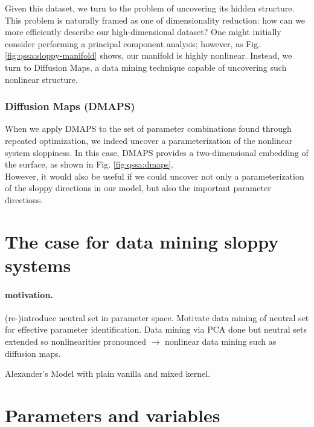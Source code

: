 \documentclass{article}
\begin{document}
Given this dataset, we turn to the problem of uncovering its hidden structure. This
problem is naturally framed as one of dimensionality reduction: how
can we more efficiently describe our high-dimensional dataset? One
might initially consider performing a principal component analysis;
however, as Fig. \ref{fig:qssa:sloppy-manifold} shows, our manifold is
highly nonlinear. Instead, we turn to Diffusion Maps, a data mining
technique capable of uncovering such nonlinear structure. \\

\subsubsection{Diffusion Maps (DMAPS)}




When we apply DMAPS to the set of parameter combinations found through
repeated optimization, we indeed uncover a parameterization of the
nonlinear system sloppiness. In this case, DMAPS provides a
two-dimensional embedding of the surface, as shown in
Fig. \ref{fig:qssa:dmaps}. \\

However, it would also be useful if we could uncover not only a
parameterization of the sloppy directions in our model, but also the
important parameter directions.




\section{The case for data mining sloppy systems}

\paragraph{motivation.}
(re-)introduce neutral set in parameter space.  Motivate data mining
of neutral set for effective parameter identification.  Data mining
via PCA done \cite{ADS06} but neutral sets extended so nonlinearities
pronounced $\rightarrow$ nonlinear data mining such as diffusion
maps.

Alexander's Model with plain vanilla and mixed kernel.

\section{Parameters and variables}
\end{document}
